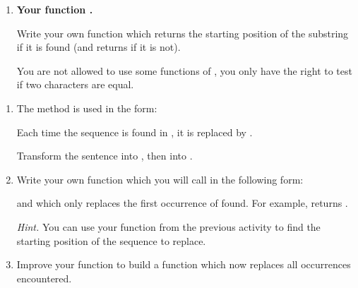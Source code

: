 \documentclass[11pt,class=report,crop=false]{standalone}
\begin{document}
\begin{activite}[Find]
\begin{enumerate}
  
  \item \textbf{Your function .}
  
  Write your own function  which returns the starting position of the substring if it is found (and returns  if it is not).
  
  You are not allowed to use some functions of \Python{}, you only have the right to test if two characters are equal. 
  
\end{enumerate}   
     
\end{activite}



\begin{activite}[Replace]


\begin{enumerate}
  \item The  method is used in the form:

	
	Each time the sequence  is found in , it is replaced by .
	
	Transform the sentence  into , then into .
	
	\item Write your own function  which you will call in the following form:	
  
 and which only replaces the first occurrence of  found. For example,  returns .
  
  
  \emph{Hint.} You can use your  function from the previous activity to find the starting position of the sequence to replace.
  
 	\item Improve your function to build a function  which now replaces all occurrences encountered.
 	    
\end{enumerate}    
\end{activite}
\end{document}
